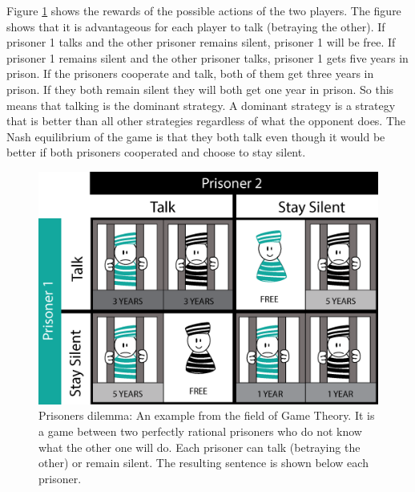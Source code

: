 
Figure \ref{Prison} shows the rewards of the possible actions of the two players. The figure shows that it is advantageous for each player to talk (betraying the other). If prisoner 1 talks and the other prisoner remains silent, prisoner 1 will be free. If prisoner 1 remains silent and the other prisoner talks, prisoner 1 gets five years in prison. If the prisoners cooperate and talk, both of them get three years in prison. If they both remain silent they will both get one year in prison. So this means that talking is the dominant strategy. A dominant strategy is a strategy that is better than all other strategies regardless of what the opponent does. The Nash equilibrium of the game is that they both talk even though it would be better if both prisoners cooperated and choose to stay silent. 

\begin{figure}[hbtp]
\centering
\includegraphics[scale=0.6]{Images/PrisDilemma}
\caption{Prisoners dilemma: An example from the field of Game Theory. It is a game between two perfectly rational prisoners who do not know what the other one will do. Each prisoner can talk (betraying the other) or remain silent. The resulting sentence is shown below each prisoner. }
\label{Prison}
\end{figure}

